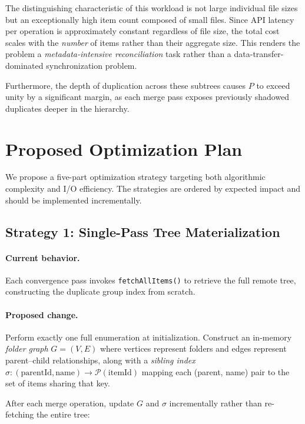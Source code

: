 \documentclass[12pt,a4paper]{article}
\begin{document}
The distinguishing characteristic of this workload is not large individual file sizes but an exceptionally high item count composed of small files. Since API latency per operation is approximately constant regardless of file size, the total cost scales with the \emph{number} of items rather than their aggregate size. This renders the problem a \emph{metadata-intensive reconciliation} task rather than a data-transfer-dominated synchronization problem.

Furthermore, the depth of duplication across these subtrees causes $P$ to exceed unity by a significant margin, as each merge pass exposes previously shadowed duplicates deeper in the hierarchy.


\section{Proposed Optimization Plan}
\label{sec:optimization}

We propose a five-part optimization strategy targeting both algorithmic complexity and I/O efficiency. The strategies are ordered by expected impact and should be implemented incrementally.

\subsection{Strategy 1: Single-Pass Tree Materialization}

\paragraph{Current behavior.} Each convergence pass invokes \texttt{fetchAllItems()} to retrieve the full remote tree, constructing the duplicate group index from scratch.

\paragraph{Proposed change.} Perform exactly one full enumeration at initialization. Construct an in-memory \emph{folder graph} $G = (V, E)$ where vertices represent folders and edges represent parent--child relationships, along with a \emph{sibling index} $\sigma: (\text{parentId}, \text{name}) \to \mathcal{P}(\text{itemId})$ mapping each (parent, name) pair to the set of items sharing that key.

After each merge operation, update $G$ and $\sigma$ incrementally rather than re-fetching the entire tree:
\end{document}
